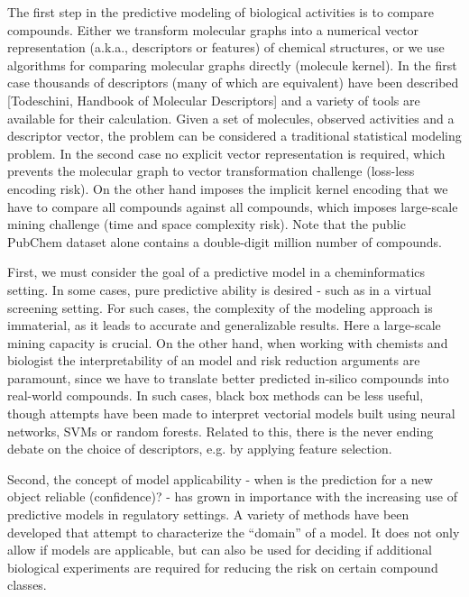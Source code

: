 \documentclass{sig-alternate}
\begin{document}
The first step in the predictive modeling of biological activities is to compare
compounds. Either we transform molecular graphs into a numerical vector
representation (a.k.a., descriptors or features) of chemical structures, or we
use algorithms for comparing molecular graphs directly (molecule kernel). In the
first case thousands of descriptors (many of which are equivalent) have been
described [Todeschini, Handbook of Molecular Descriptors] and a variety of tools
are available for their calculation. Given a set of molecules, observed
activities and a descriptor vector, the problem can be considered a traditional
statistical modeling problem. In the second case no explicit vector
representation is required, which prevents the molecular graph to vector
transformation challenge (loss-less encoding risk). On the other hand imposes
the implicit kernel encoding that we have to compare all compounds against all
compounds, which imposes large-scale mining challenge (time and space complexity
risk). Note that the public PubChem dataset alone contains a double-digit
million number of compounds.

First, we must consider the goal of a predictive model in a cheminformatics
setting. In some cases, pure predictive ability is desired - such as in a
virtual screening setting. For such cases, the complexity of the modeling
approach is immaterial, as it leads to accurate and generalizable results. Here
a large-scale mining capacity is crucial. On the other hand, when working with
chemists and biologist the interpretability of an model and risk reduction
arguments are paramount, since we have to translate better predicted in-silico
compounds into real-world compounds. In such cases, black box methods can be
less useful, though attempts have been made to interpret vectorial models built
using neural networks, SVMs or random forests. Related to this, there is the
never ending debate on the choice of descriptors, e.g. by applying feature
selection.

Second, the concept of model applicability - when is the prediction for a new
object reliable (confidence)? - has grown in importance with the increasing use
of predictive models in regulatory settings. A variety of methods have been
developed that attempt to characterize the “domain” of a model. It does not only
allow if models are applicable, but can also be used for deciding if additional
biological experiments are required for reducing the risk on certain compound
classes.
\end{document}
